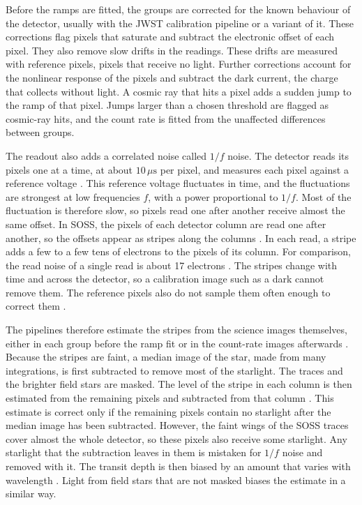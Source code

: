 Before the ramps are fitted, the groups are corrected for the known behaviour
of the detector, usually with the JWST calibration pipeline
\citep{JWSTPipeline2025} or a variant of it. These corrections flag pixels
that saturate and subtract the electronic offset of each pixel. They also remove slow drifts in the readings. These drifts are measured with reference pixels, pixels that receive no light. Further corrections account for the nonlinear response
of the pixels and subtract the dark current, the charge that collects without
light. A cosmic ray that hits a pixel adds a sudden jump to the ramp of that
pixel. Jumps larger than a chosen threshold are flagged as cosmic-ray hits,
and the count rate is fitted from the unaffected differences between groups.

The readout also adds a correlated noise called $1/f$ noise. The detector
reads its pixels one at a time, at about $10\,\mu\mathrm{s}$ per pixel, and measures
each pixel against a reference voltage \citep{AlbertEtAl2023}. This reference
voltage fluctuates in time, and the fluctuations are strongest at low
frequencies $f$, with a power proportional to $1/f$. Most of the fluctuation
is therefore slow, so pixels read one after another receive almost the same
offset. In SOSS, the pixels of each detector column are read one after
another, so the offsets appear as stripes along the columns
\citep{AlbertEtAl2023,RadicaEtAl2023}. In each read, a stripe adds a few to a
few tens of electrons to the pixels of its column. For comparison, the read
noise of a single read is about 17 electrons \citep{AlbertEtAl2023}. The
stripes change with time and across the detector, so a calibration image such
as a dark cannot remove them. The reference pixels also do not sample them
often enough to correct them \citep{AlbertEtAl2023,RadicaEtAl2023}.

The pipelines therefore estimate the stripes from the science images
themselves, either in each group before the ramp fit or in the count-rate
images afterwards \citep{LouieEtAl2025}. Because the stripes are faint, a
median image of the star, made from many integrations, is first subtracted to
remove most of the starlight. The traces and the brighter field stars are
masked. The level of the stripe in each column is then estimated from the
remaining pixels and subtracted from that column
\citep{AlbertEtAl2023,RadicaEtAl2023,LouieEtAl2025}. This estimate is correct
only if the remaining pixels contain no starlight after the median image has
been subtracted. However, the faint wings of the SOSS traces cover almost the
whole detector, so these pixels also receive some starlight. Any starlight
that the subtraction leaves in them is mistaken for $1/f$ noise and removed
with it. The transit depth is then biased by an amount that varies with
wavelength \citep{RadicaEtAl2023}. Light from field stars that are not masked
biases the estimate in a similar way.

